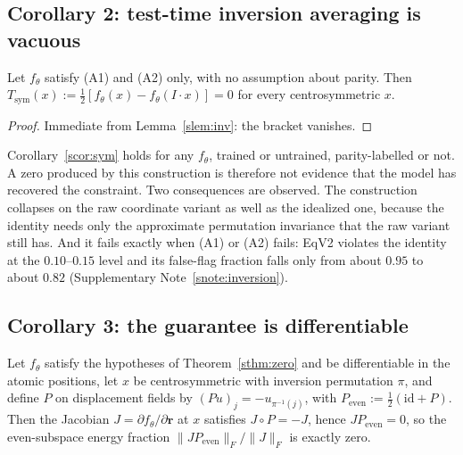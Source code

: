 \subsection*{Corollary 2: test-time inversion averaging is vacuous}

\begin{corollary}\label{scor:sym}
Let $f_\theta$ satisfy (A1) and (A2) only, with no assumption about parity. Then $T_{\mathrm{sym}}(x) := \tfrac{1}{2}[f_\theta(x) - f_\theta(I\!\cdot\!x)] = 0$ for every centrosymmetric $x$.
\end{corollary}

\begin{proof}
Immediate from Lemma~\ref{slem:inv}: the bracket vanishes.
\end{proof}

Corollary~\ref{scor:sym} holds for any $f_\theta$, trained or untrained, parity-labelled or not. A zero produced by this construction is therefore not evidence that the model has recovered the constraint. Two consequences are observed. The construction collapses on the raw coordinate variant as well as the idealized one, because the identity needs only the approximate permutation invariance that the raw variant still has. And it fails exactly when (A1) or (A2) fails: EqV2 violates the identity at the $0.10$--$0.15$ level and its false-flag fraction falls only from about $0.95$ to about $0.82$ (Supplementary Note~\ref{snote:inversion}).

\subsection*{Corollary 3: the guarantee is differentiable}

\begin{corollary}\label{scor:jac}
Let $f_\theta$ satisfy the hypotheses of Theorem~\ref{sthm:zero} and be differentiable in the atomic positions, let $x$ be centrosymmetric with inversion permutation $\pi$, and define $P$ on displacement fields by $(Pu)_{j} = -u_{\pi^{-1}(j)}$, with $P_{\mathrm{even}} := \tfrac{1}{2}(\mathrm{id} + P)$. Then the Jacobian $J = \partial f_\theta/\partial\mathbf{r}$ at $x$ satisfies $J \circ P = -J$, hence $J P_{\mathrm{even}} = 0$, so the even-subspace energy fraction $\lVert J P_{\mathrm{even}}\rVert_F / \lVert J \rVert_F$ is exactly zero.
\end{corollary}

